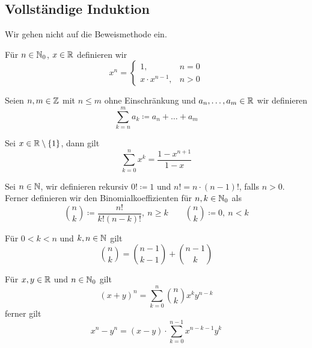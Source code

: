     \subsection{Vollständige Induktion} Wir gehen nicht auf die Beweismethode ein. 
    \begin{defn}
        Für $n\in \mathbb{N}_0$, $x\in \mathbb{R}$ definieren wir 
        \[
            x^n = \begin{cases}
                1, & n=0 \\ 
                x\cdot x^{n-1}, & n>0 
            \end{cases}
        \]
    \end{defn}
    \begin{defn}
        Seien $n,m\in \mathbb{Z}$ mit $n\le m$ ohne Einschränkung und $a_n,\ldots,a_m\in \mathbb{R}$ wir definieren 
        \[
        \sum_{k=n}^m a_k \coloneqq a_n+\ldots+a_m    
        \]
    \end{defn}
    \begin{lemma}
        Sei $x\in \mathbb{R}\setminus \{1\}$, dann gilt 
        \[
        \sum_{k=0}^n x^k = \frac{1-x^{n+1}}{1-x}    
        \]
    \end{lemma}
    \begin{defn}
        Sei $n\in \mathbb{N}$, wir definieren rekursiv $0!\coloneqq 1$ und $n! = n\cdot (n-1)!$, falls $n>0$. \\
        Ferner definieren wir den Binomialkoeffizienten für $n,k\in \mathbb{N}_0$ als
        \[
        \binom{n}{k} \coloneqq \frac{n!}{k!(n-k)!}, \ n\ge k \qquad \binom{n}{k} \coloneqq 0, \ n<k   
        \]
    \end{defn}
    \begin{lemma}
        Für $0<k<n$ und $k,n\in \mathbb{N}$ gilt 
        \[
        \binom{n}{k} = \binom{n-1}{k-1} + \binom{n-1}{k}    
        \]
    \end{lemma}
    \begin{lemma}
        Für $x,y\in \mathbb{R}$ und $n\in \mathbb{N}_0$ gilt
        \[
        (x+y)^n = \sum_{k=0}^n \binom{n}{k}x^k y^{n-k}    
        \]
        ferner gilt 
        \[
        x^n - y^n = (x-y)\cdot \sum_{k=0}^{n-1} x^{n-k-1}y^k    
        \]
    \end{lemma}
